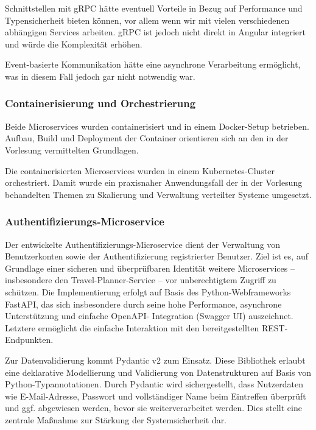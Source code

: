 Schnittstellen mit gRPC hätte eventuell Vorteile in Bezug auf Performance und Typensicherheit bieten können, vor allem wenn wir mit vielen verschiedenen abhängigen Services arbeiten. gRPC ist jedoch nicht direkt in Angular integriert und würde die Komplexität erhöhen.

Event-basierte Kommunikation hätte eine asynchrone Verarbeitung ermöglicht, was in diesem Fall jedoch gar nicht notwendig war.

\subsubsection{Containerisierung und Orchestrierung}

Beide Microservices wurden containerisiert und in einem Docker-Setup betrieben. Aufbau, Build und Deployment der Container orientieren sich an den in der Vorlesung vermittelten Grundlagen.

Die containerisierten Microservices wurden in einem Kubernetes-Cluster orchestriert. Damit wurde ein praxisnaher Anwendungsfall der in der Vorlesung behandelten Themen zu Skalierung und Verwaltung verteilter Systeme umgesetzt.

\subsubsection{Authentifizierungs-Microservice}

Der entwickelte Authentifizierungs-Microservice dient der Verwaltung von Benutzerkonten sowie der Authentifizierung registrierter Benutzer. Ziel ist es, auf Grundlage einer sicheren und überprüfbaren Identität weitere Microservices – insbesondere den Travel-Planner-Service – vor unberechtigtem Zugriff zu schützen. Die Implementierung erfolgt auf Basis des Python-Webframeworks FastAPI, das sich insbesondere durch seine hohe Performance, asynchrone Unterstützung und einfache OpenAPI- Integration (Swagger UI) auszeichnet. Letztere ermöglicht die einfache Interaktion mit den bereitgestellten REST-Endpunkten.

Zur Datenvalidierung kommt Pydantic v2 zum Einsatz. Diese Bibliothek erlaubt eine deklarative Modellierung und Validierung von Datenstrukturen auf Basis von Python-Typannotationen. Durch Pydantic wird sichergestellt, dass Nutzerdaten wie E-Mail-Adresse, Passwort und vollständiger Name beim Eintreffen überprüft und ggf. abgewiesen werden, bevor sie weiterverarbeitet werden. Dies stellt eine zentrale Maßnahme zur Stärkung der Systemsicherheit dar.

